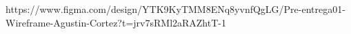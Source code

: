 https://www.figma.com/design/YTK9KyTMM8ENq8yvnfQgLG/Pre-entrega01-Wireframe-Agustin-Cortez?t=jrv7sRMl2aRAZhtT-1